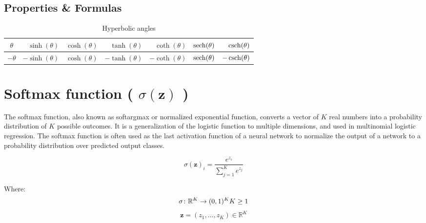 \subsection{Properties \& Formulas}

\begin{customTableWrapper}{1}
\begin{table}[H]
    \centering
    \begin{tabular}{|c|r|r|r|r|r|r|}
        \hline
        $\theta$ & $\sinh(\theta)$ & $\cosh(\theta)$ & $\tanh(\theta)$ & $\coth(\theta)$ & $\operatorname{sech}(\theta)$ & $\operatorname{csch}(\theta)$ \\ \hline

        $-\theta$ & $-\sinh(\theta)$ & $\cosh(\theta)$ & $-\tanh(\theta)$ & $-\coth(\theta)$ & $\operatorname{sech}(\theta)$ & $-\operatorname{csch}(\theta)$ \\ \hline
    \end{tabular}
    \caption{Hyperbolic angles}
\end{table}
\end{customTableWrapper}


\section{Softmax function ( $\sigma (\mathbf {z})$ ) \cite{wiki-softmax-function}}\label{Softmax function}
The softmax function, also known as softargmax or normalized exponential function, converts a vector of $K$ real numbers into a probability distribution of $K$ possible outcomes. It is a generalization of the logistic function to multiple dimensions, and used in multinomial logistic regression. The softmax function is often used as the last activation function of a neural network to normalize the output of a network to a probability distribution over predicted output classes.

\[
    {\displaystyle \sigma (\mathbf {z} )_{i}={\displaystyle\frac {e^{z_{i}}}{\sum _{j=1}^{K}e^{z_{j}}}}}
\]

Where:
\[
    {\displaystyle \sigma \colon \mathbb {R} ^{K}\to (0,1)^{K}}
    \hfill
    {\displaystyle K\geq 1}
\]
\[
    {\displaystyle \mathbf {z} =(z_{1},\dotsc ,z_{K})\in \mathbb {R} ^{K}}
\]





















































